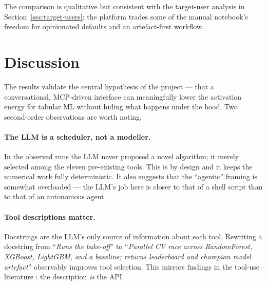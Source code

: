 The comparison is qualitative but consistent with the target-user
analysis in Section~\ref{sec:target-users}: the platform trades
some of the manual notebook's freedom for opinionated defaults and
an artefact-first workflow.

\section{Discussion}
\label{sec:discussion}

The results validate the central hypothesis of the project --- that
a conversational, MCP-driven interface can meaningfully lower the
activation energy for tabular ML without hiding what happens under
the hood. Two second-order observations are worth noting.

\paragraph{The LLM is a scheduler, not a modeller.}
In the observed runs the LLM never proposed a novel algorithm; it
merely selected among the eleven pre-existing tools. This is by
design and it keeps the numerical work fully deterministic. It also
suggests that the ``agentic'' framing is somewhat overloaded --- the
LLM's job here is closer to that of a shell script than to that of
an autonomous agent.

\paragraph{Tool descriptions matter.}
Docstrings are the LLM's only source of information about each
tool. Rewriting a docstring from ``\emph{Runs the bake-off}'' to
``\emph{Parallel CV race across RandomForest, XGBoost, LightGBM, and
a baseline; returns leaderboard and champion model artefact}''
observably improves tool selection. This mirrors findings in the
tool-use literature \citep{patil2023gorilla, qin2024toolllm}: the
description \emph{is} the API.
